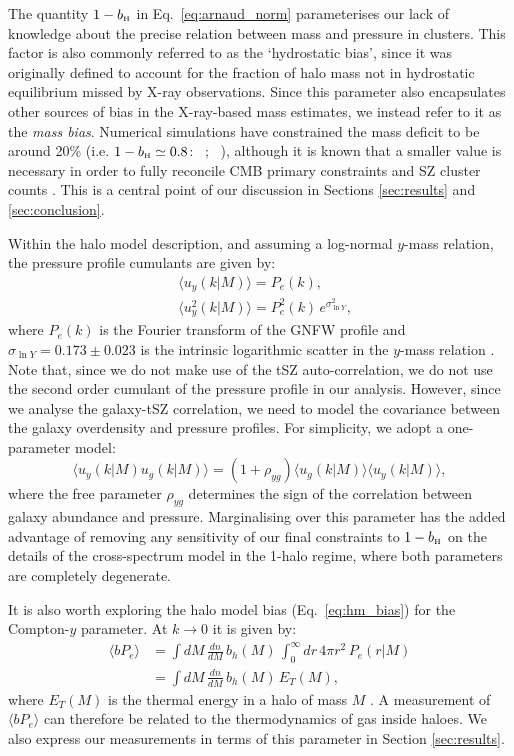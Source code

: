 \documentclass[useAMS,usenatbib]{mn2e}
\def\bH{b_{\scriptscriptstyle\rm H}}
\def\citejap#1{\citeauthor{#1}\ \citeyear{#1}}
\begin{document}
      The quantity $1-\bH$ in Eq.\!~\ref{eq:arnaud_norm} parameterises our lack of knowledge about the precise relation between mass and pressure in clusters. This factor is also commonly referred to as the `hydrostatic bias', since it was originally defined to account for the fraction of halo mass not in hydrostatic equilibrium missed by X-ray observations. Since this parameter also encapsulates other sources of bias in the X-ray-based mass estimates, we instead refer to it as the {\sl mass bias}. Numerical simulations have constrained the mass deficit to be around 20\% (i.e. $1-\bH\simeq0.8$: \citejap{2012ApJ...758...74B}; \citejap{2014ApJ...782..107N}), although it is known that a smaller value is necessary in order to fully reconcile CMB primary constraints and SZ cluster counts \citep{2016A&A...594A..24P}. This is a central point of our discussion in Sections \ref{sec:results} and \ref{sec:conclusion}.

      Within the halo model description, and assuming a log-normal $y$-mass relation, the pressure profile cumulants are given by:
      \begin{align}
        &\langle u_y(k|M)\rangle=P_e(k),\\
        &\langle u_y^2(k|M)\rangle=P_e^2(k)\,e^{\sigma_{\ln Y}^2},
      \end{align}
      where $P_e(k)$ is the Fourier transform of the GNFW profile and $\sigma_{\ln Y}=0.173\pm0.023$ is the intrinsic logarithmic scatter in the $y$-mass relation \cite{2016A&A...594A..24P}. Note that, since we do not make use of the tSZ auto-correlation, we do not use the second order cumulant of the pressure profile in our analysis. However, since we analyse the galaxy-tSZ correlation, we need to model the covariance between the galaxy overdensity and pressure profiles. For simplicity, we adopt a one-parameter model:
      \begin{equation}
        \langle u_y(k|M) u_g(k|M)\rangle = (1+\rho_{yg})\langle u_g(k|M)\rangle \langle u_y(k|M)\rangle,
      \end{equation}
      where the free parameter $\rho_{yg}$ determines the sign of the correlation between galaxy abundance and pressure. Marginalising over this parameter has the added advantage of removing any sensitivity of our final constraints to $1-\bH$ on the details of the cross-spectrum model in the 1-halo regime, where both parameters are completely degenerate.

      It is also worth exploring the halo model bias (Eq.\!~\ref{eq:hm_bias}) for the Compton-$y$ parameter. At $k\rightarrow0$ it is given by:
      \begin{align}\nonumber
        \langle bP_e\rangle&=\int dM\,\frac{dn}{dM}\,b_h(M)\,\int_0^\infty dr\,4\pi r^2\,P_e(r|M)\\\label{eq:by}
               &=\int dM\,\frac{dn}{dM}\,b_h(M)\,E_T(M),
      \end{align}
      where $E_T(M)$ is the thermal energy in a halo of mass $M$ \citep{2017MNRAS.467.2315V,2019arXiv190413347P}. A measurement of $\langle bP_e\rangle$ can therefore be related to the thermodynamics of gas inside haloes. We also express our measurements in terms of this parameter in Section \ref{sec:results}.
      
\end{document}
